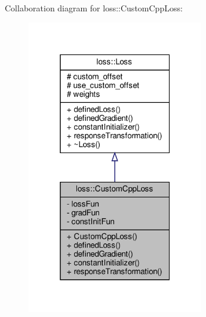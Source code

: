 Collaboration diagram for loss\+:\+:Custom\+Cpp\+Loss\+:\nopagebreak
\begin{figure}[H]
\begin{center}
\leavevmode
\includegraphics[width=217pt]{classloss_1_1_custom_cpp_loss__coll__graph}
\end{center}
\end{figure}
